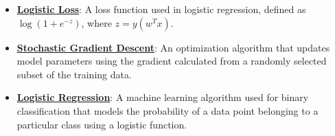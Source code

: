 \documentclass{article}%
\begin{document}
\begin{itemize}[leftmargin=*]
\item \href{https://purdue.brightspace.com/d2l/common/assets/pdfjs-d2l-dist/1.0.14-legacy/web/viewer.html?file=\%2Fcontent\%2Fenforced\%2F1095467-wl.202510.CS.24300.001\%2F05L2-ML Basics.pdf\%3Fou\%3D1095467\&lang=en-us\&container=d2l-fileviewer-rendered-pdf\&fullscreen=d2l-fileviewer-rendered-pdf-dialog\&height=667#page=27}{\textbf{Logistic Loss}}: A loss function used in logistic regression, defined as $\log(1 + e^{-z})$, where $z = y(w^Tx)$.%
\item \href{https://purdue.brightspace.com/d2l/common/assets/pdfjs-d2l-dist/1.0.14-legacy/web/viewer.html?file=\%2Fcontent\%2Fenforced\%2F1095467-wl.202510.CS.24300.001\%2F05L2-ML Basics.pdf\%3Fou\%3D1095467\&lang=en-us\&container=d2l-fileviewer-rendered-pdf\&fullscreen=d2l-fileviewer-rendered-pdf-dialog\&height=667#page=29}{\textbf{Stochastic Gradient Descent}}: An optimization algorithm that updates model parameters using the gradient calculated from a randomly selected subset of the training data.%
\item \href{https://purdue.brightspace.com/d2l/common/assets/pdfjs-d2l-dist/1.0.14-legacy/web/viewer.html?file=\%2Fcontent\%2Fenforced\%2F1095467-wl.202510.CS.24300.001\%2F05L2-ML Basics.pdf\%3Fou\%3D1095467\&lang=en-us\&container=d2l-fileviewer-rendered-pdf\&fullscreen=d2l-fileviewer-rendered-pdf-dialog\&height=667#page=31}{\textbf{Logistic Regression}}: A machine learning algorithm used for binary classification that models the probability of a data point belonging to a particular class using a logistic function.%
\end{itemize}

%
\end{document}
